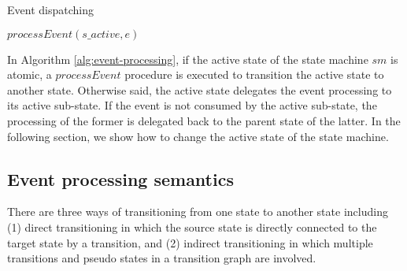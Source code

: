 \begin{algorithm}[]
	\caption{Event dispatching
		\label{alg:event-processing}}
	\begin{algorithmic}[1]
			\EndFor	 			 
		\EndIf
				\State $processEvent(s\_active, e)$
			\EndIf
		\EndIf
		\EndProcedure	
	\end{algorithmic}
\end{algorithm}

In Algorithm \ref{alg:event-processing}, if the active state of the state machine $sm$ is atomic, a $processEvent$ procedure is executed to transition the active state to another state. Otherwise said, the active state delegates the event processing to its active sub-state. If the event is not consumed by the active sub-state, the processing of the former is delegated back to the parent state of the latter. In the following section, we show how to change the active state of the state machine.


\subsection{Event processing semantics}
There are three ways of transitioning from one state to another state including (1) direct transitioning in which the source state is directly connected to the target state by a transition, and (2) indirect transitioning in which multiple transitions and pseudo states in a transition graph are involved.

